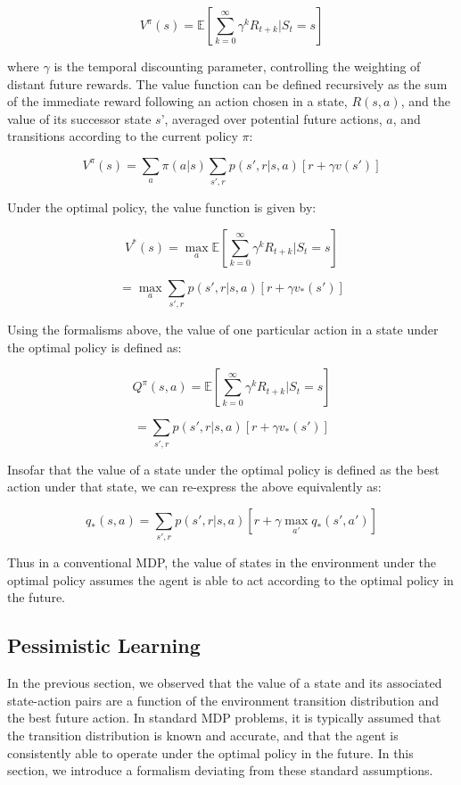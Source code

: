 \documentclass[11pt]{article} %
\begin{document}
$$ V^\pi(s) = \mathbb{E} \left[ \sum^{\infty}_{k=0} \gamma^k R_{t+k} | S_t = s \right] $$

where $\gamma$ is the temporal discounting parameter, controlling the weighting
of distant future rewards. The value function can be defined recursively as the
sum of the immediate reward following an action chosen in a state, $R(s, a)$, and
the value of its successor state $s’$, averaged over potential future actions, $a$,
and transitions according to the current policy $\pi$:

$$ V^\pi(s) = \sum_a \pi(a|s) \sum_{s',r}p(s',r|s,a) \left[ r + \gamma v(s') \right] $$

Under the optimal policy, the value function is given by:

$$ V^*(s) = \max_a \mathbb{E} \left[ \sum^{\infty}_{k=0} \gamma^k R_{t+k} | S_t = s \right] $$

$$ = \max_a \sum_{s',r}p(s',r|s,a) \left[ r + \gamma v_*(s') \right] $$

Using the formalisms above, the value of one particular action in a state under
the optimal policy is defined as:

$$ Q^\pi(s,a) = \mathbb{E} \left[ \sum^{\infty}_{k=0} \gamma^k R_{t+k} | S_t = s \right] $$

$$ = \sum_{s',r}p(s',r|s,a) \left[ r + \gamma v_*(s') \right] $$

Insofar that the value of a state under the optimal policy is defined as the best
action under that state, we can re-express the above equivalently as:

$$ q_*(s,a) = \sum_{s',r}p(s',r|s,a) \left[ r + \gamma \max_{a'} q_*(s',a') \right] $$

Thus in a conventional MDP, the value of states in the environment under the optimal
policy assumes the agent is able to act according to the optimal policy in the future.

\subsection{Pessimistic Learning}

In the previous section, we observed that the value of a state and its associated
state-action pairs are a function of the environment transition distribution and
the best future action. In standard MDP problems, it is typically assumed that the
transition distribution is known and accurate, and that the agent is consistently
able to operate under the optimal policy in the future. In this section, we introduce
a formalism deviating from these standard assumptions.
\end{document}
